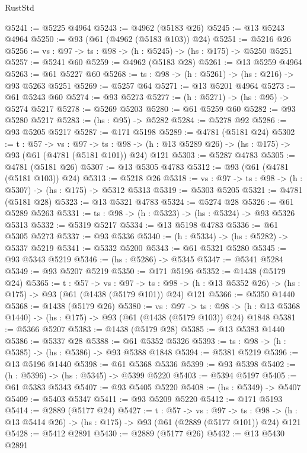 \begin{lexlean}{RustStd}
\begin{coremodule}
@5241 := @5225 @4964
@5243 := @4962 (@5183 @26)
@5245 := @13 @5243 @4964
@5250 := @93 (@61 (@4962 (@5183 @103)) @24)
@5251 := @5216 @26
@5256 := {vs : @97} -> {ts : @98} -> (h : @5245) -> (hs : @175) -> @5250 @5251
@5257 := @5241 @60
@5259 := @4962 (@5183 @28)
@5261 := @13 @5259 @4964
@5263 := @61 @5227 @60
@5268 := {ts : @98} -> (h : @5261) -> (hs : @216) -> @93 @5263 @5251
@5269 := @5257 @64
@5271 := @13 @5201 @4964
@5273 := @61 @5243 @60
@5274 := @93 @5273
@5277 := (h : @5271) -> (hs : @95) -> @5274 @5217
@5278 := @5269 @5203
@5280 := @61 @5259 @60
@5282 := @93 @5280 @5217
@5283 := (hs : @95) -> @5282
@5284 := @5278 @92
@5286 := @93 @5205 @5217
@5287 := @171 @5198
@5289 := @4781 (@5181 @24)
@5302 := {t : @57} ->
  {vs : @97} ->
  {ts : @98} -> (h : @13 @5289 @26) -> (hs : @175) -> @93 (@61 (@4781 (@5181 @101)) @24) @121
@5303 := @5287 @4783
@5305 := @4781 (@5181 @26)
@5307 := @13 @5305 @4783
@5312 := @93 (@61 (@4781 (@5181 @103)) @24)
@5313 := @5218 @26
@5318 := {vs : @97} -> {ts : @98} -> (h : @5307) -> (hs : @175) -> @5312 @5313
@5319 := @5303 @5205
@5321 := @4781 (@5181 @28)
@5323 := @13 @5321 @4783
@5324 := @5274 @28
@5326 := @61 @5289 @5263
@5331 := {ts : @98} -> (h : @5323) -> (hs : @5324) -> @93 @5326 @5313
@5332 := @5319 @5217
@5334 := @13 @5198 @4783
@5336 := @61 @5305 @5273
@5337 := @93 @5336
@5340 := (h : @5334) -> (hs : @5282) -> @5337 @5219
@5341 := @5332 @5200
@5343 := @61 @5321 @5280
@5345 := @93 @5343 @5219
@5346 := (hs : @5286) -> @5345
@5347 := @5341 @5284
@5349 := @93 @5207 @5219
@5350 := @171 @5196
@5352 := @1438 (@5179 @24)
@5365 := {t : @57} ->
  {vs : @97} ->
  {ts : @98} -> (h : @13 @5352 @26) -> (hs : @175) -> @93 (@61 (@1438 (@5179 @101)) @24) @121
@5366 := @5350 @1440
@5368 := @1438 (@5179 @26)
@5380 := {vs : @97} ->
  {ts : @98} -> (h : @13 @5368 @1440) -> (hs : @175) -> @93 (@61 (@1438 (@5179 @103)) @24) @1848
@5381 := @5366 @5207
@5383 := @1438 (@5179 @28)
@5385 := @13 @5383 @1440
@5386 := @5337 @28
@5388 := @61 @5352 @5326
@5393 := {ts : @98} -> (h : @5385) -> (hs : @5386) -> @93 @5388 @1848
@5394 := @5381 @5219
@5396 := @13 @5196 @1440
@5398 := @61 @5368 @5336
@5399 := @93 @5398
@5402 := (h : @5396) -> (hs : @5345) -> @5399 @5220
@5403 := @5394 @5197
@5405 := @61 @5383 @5343
@5407 := @93 @5405 @5220
@5408 := (hs : @5349) -> @5407
@5409 := @5403 @5347
@5411 := @93 @5209 @5220
@5412 := @171 @5193
@5414 := @2889 (@5177 @24)
@5427 := {t : @57} ->
  {vs : @97} ->
  {ts : @98} -> (h : @13 @5414 @26) -> (hs : @175) -> @93 (@61 (@2889 (@5177 @101)) @24) @121
@5428 := @5412 @2891
@5430 := @2889 (@5177 @26)
@5432 := @13 @5430 @2891

\end{coremodule}
\end{lexlean}
